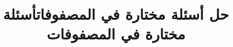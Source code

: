 \documentclass[12pt]{article}
\title{حل أسئلة مختارة في المصفوفات}
\title{أسئلة مختارة في المصفوفات}
\begin{document}
\maketitle
\renewcommand{\contentsname}{جدول المحتويات}
\tableofcontents
\clearpage




\end{document}
